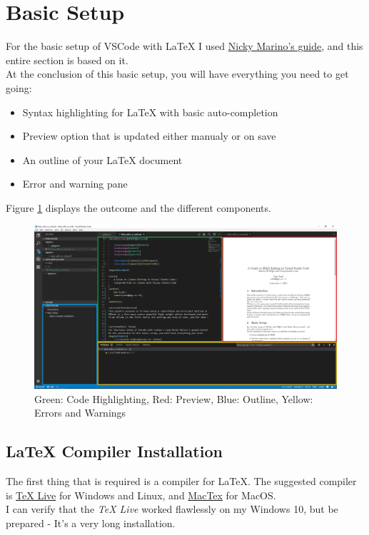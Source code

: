 \documentclass{article}
\newcommand{\latex}{\LaTeX\xspace}
\begin{document}
\section{Basic Setup} \label{sec:basic_setup}
For the basic setup of VSCode with \latex I used \href{https://dev.to/nickymarino/lets-use-latex}{Nicky Marino's guide}, and this entire section is based on it.\\
At the conclusion of this basic setup, you will have everything you need to get going:
\begin{itemize}
	\item{Syntax highlighting for \latex with basic auto-completion}
	\item{Preview option that is updated either manualy or on save}
	\item{An outline of your \latex document}
	\item{Error and warning pane}
\end{itemize}
Figure \ref{fig:vscode_with_latex_highlights} displays the outcome and the different components.
\begin{figure}
	\includegraphics[width=\linewidth]{../resources/vscode_with_latex_highlights.png}
	\caption{Green: Code Highlighting, Red: Preview, Blue: Outline, Yellow: Errors and Warnings}
	\label{fig:vscode_with_latex_highlights}
\end{figure}

\subsection{\latex Compiler Installation}
The first thing that is required is a compiler for \latex. The suggested compiler is \href{https://www.tug.org/texlive/}{TeX Live} for Windows and Linux, and \href{https://www.tug.org/mactex/}{MacTex} for MacOS.\\
I can verify that the \emph{TeX Live} worked flawlessly on my Windows 10, but be prepared - It's a very long installation.
\end{document}
